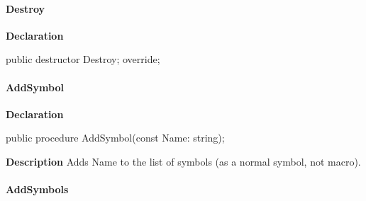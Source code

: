 \documentclass{report}
\newif\ifpdf
\begin{document}
\paragraph*{Destroy}\hspace*{\fill}

\label{PasDoc_Scanner.TScanner-Destroy}
\begin{list}{}{
\setlength{\itemindent}{0cm}
\setlength{\listparindent}{0cm}
\setlength{\leftmargin}{\evensidemargin}
\addtolength{\leftmargin}{\tmplength}
\settowidth{\labelsep}{X}
\addtolength{\leftmargin}{\labelsep}
\setlength{\labelwidth}{\tmplength}
}
\item[\textbf{Declaration}\hfill]
\ifpdf
\begin{flushleft}
\fi
\begin{ttfamily}
public destructor Destroy; override;\end{ttfamily}

\ifpdf
\end{flushleft}
\fi

\end{list}
\paragraph*{AddSymbol}\hspace*{\fill}

\label{PasDoc_Scanner.TScanner-AddSymbol}
\begin{list}{}{
\setlength{\itemindent}{0cm}
\setlength{\listparindent}{0cm}
\setlength{\leftmargin}{\evensidemargin}
\addtolength{\leftmargin}{\tmplength}
\settowidth{\labelsep}{X}
\addtolength{\leftmargin}{\labelsep}
\setlength{\labelwidth}{\tmplength}
}
\item[\textbf{Declaration}\hfill]
\ifpdf
\begin{flushleft}
\fi
\begin{ttfamily}
public procedure AddSymbol(const Name: string);\end{ttfamily}

\ifpdf
\end{flushleft}
\fi

\par
\item[\textbf{Description}]
Adds Name to the list of symbols (as a normal symbol, not macro).

\end{list}
\paragraph*{AddSymbols}\hspace*{\fill}
\end{document}

